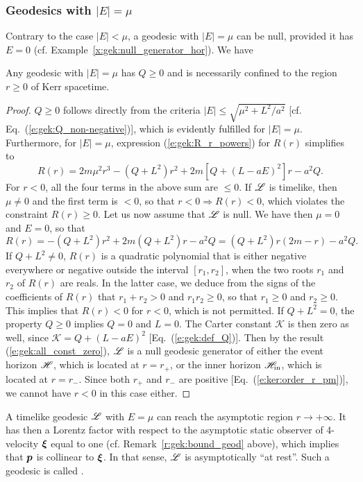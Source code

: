 \subsubsection{Geodesics with $|E|=\mu$}

Contrary to the case $|E|<\mu$, a geodesic with $|E|=\mu$ can be null,
provided it has $E=0$
(cf. Example~\ref{x:gek:null_generator_hor}).
We have
\begin{tprop}{}{}
Any geodesic with $|E|=\mu$ has $Q\geq 0$ and is necessarily confined
to the region $r\geq 0$ of Kerr spacetime.
\end{tprop}

\begin{proof}
$Q\geq 0$ follows directly from the criteria $|E| \leq \sqrt{\mu^2 + {L^2}/{a^2}}$
[cf. Eq.~(\ref{e:gek:Q_non-negative})],
which is evidently fulfilled for $|E|=\mu$.
Furthermore, for $|E|=\mu$, expression (\ref{e:gek:R_r_powers}) for $R(r)$
simplifies to
\[
    R(r) =  2 m \mu^2 r^3 - (Q + L^2) r^2 + 2m  \left[Q + (L-aE)^2 \right] r - a^2 Q .
\]
For $r<0$, all the four terms in the above sum are $\leq 0$.
If $\mathscr{L}$ is timelike, then $\mu\neq 0$ and the first term is $<0$, so that
$r<0 \Longrightarrow R(r) < 0$, which violates the constraint
$R(r) \geq 0$. Let us now assume that $\mathscr{L}$ is null.
We have then $\mu=0$ and $E=0$, so that
\[
    R(r) = - (Q + L^2) r^2 + 2m  (Q + L^2) r -a^2 Q = (Q+L^2) r ( 2m - r) -a^2 Q.
\]
If $Q + L^2 \neq 0$, $R(r)$ is a quadratic polynomial that is
either negative everywhere or negative outside the interval $[r_1, r_2]$,
when the two roots $r_1$ and $r_2$ of $R(r)$ are reals. In the latter case, we deduce
from the signs of the coefficients of $R(r)$ that $r_1+r_2 > 0$ and $r_1 r_2 \geq 0$,
so that $r_1 \geq 0$ and $r_2 \geq 0$. This implies that $R(r) < 0$ for
$r<0$, which is not permitted.
If $Q + L^2 = 0$, the property $Q\geq 0$ implies $Q=0$ and $L = 0$.
The Carter constant $\mathscr{K}$ is then zero as well, since
$\mathscr{K} = Q + (L - a E)^2$ [Eq.~(\ref{e:gek:def_Q})].
Then by the result (\ref{e:gek:all_const_zero}), $\mathscr{L}$ is a null geodesic
generator of either the event horizon $\mathscr{H}$, which is located at $r=r_+$,
or the inner horizon $\mathscr{H}_{\rm in}$, which is located at $r=r_-$.
Since both $r_+$ and $r_-$ are positive
[Eq.~(\ref{e:ker:order_r_pm})], we cannot have $r<0$ in this case either.
\end{proof}

A timelike geodesic $\mathscr{L}$ with $E=\mu$ can reach the asymptotic region
$r\to +\infty$. It has then a Lorentz factor
with respect to the asymptotic static observer of 4-velocity $\bm{\xi}$
equal to one (cf. Remark~\ref{r:gek:bound_geod} above), which implies that
$\bm{p}$ is collinear to $\bm{\xi}$. In that sense, $\mathscr{L}$
is asymptotically ``at rest''. Such a geodesic is called
.


